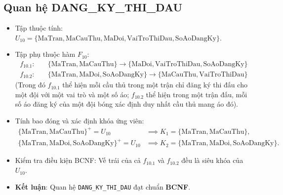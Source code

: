\subsection{Quan hệ DANG\_KY\_THI\_DAU}
\begin{itemize}
    \item Tập thuộc tính: $U_{10} = \{\text{MaTran}, \text{MaCauThu}, \text{MaDoi}, \text{VaiTroThiDau}, \text{SoAoDangKy}\}$.
    \item Tập phụ thuộc hàm $F_{10}$:
    \begin{align*}
        f_{10.1}: & \quad \{\text{MaTran}, \text{MaCauThu}\} \rightarrow \{\text{MaDoi}, \text{VaiTroThiDau}, \text{SoAoDangKy}\} \\
        f_{10.2}: & \quad \{\text{MaTran}, \text{MaDoi}, \text{SoAoDangKy}\} \rightarrow \{\text{MaCauThu}, \text{VaiTroThiDau}\}
    \end{align*}
    (Trong đó $f_{10.1}$ thể hiện mỗi cầu thủ trong một trận chỉ đăng ký thi đấu cho một đội với một vai trò và một số áo; $f_{10.2}$ thể hiện trong một trận đấu, mỗi số áo đăng ký của một đội bóng xác định duy nhất cầu thủ mang áo đó).
    \item Tính bao đóng và xác định khóa ứng viên:
    \begin{align*}
        \{\text{MaTran}, \text{MaCauThu}\}^+ = U_{10} &\implies K_1 = \{\text{MaTran}, \text{MaCauThu}\}, \\
        \{\text{MaTran}, \text{MaDoi}, \text{SoAoDangKy}\}^+ = U_{10} &\implies K_2 = \{\text{MaTran}, \text{MaDoi}, \text{SoAoDangKy}\}.
    \end{align*}
    \item Kiểm tra điều kiện BCNF: Vế trái của cả $f_{10.1}$ và $f_{10.2}$ đều là siêu khóa của $U_{10}$.
    \item \textbf{Kết luận}: Quan hệ \texttt{DANG\_KY\_THI\_DAU} đạt chuẩn \textbf{BCNF}.
\end{itemize}

